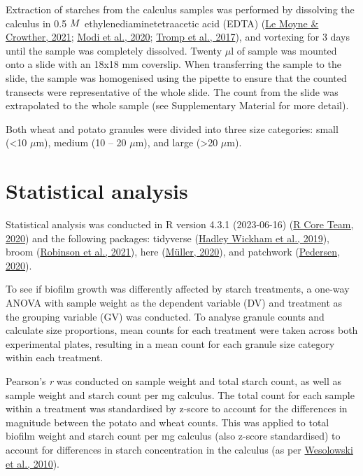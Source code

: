 \documentclass[
  letterpaper,
]{book}
\begin{document}
Extraction of starches from the calculus samples was performed by
dissolving the calculus in 0.5 \(\tiny{M}\) ethylenediaminetetraacetic
acid (EDTA) (\protect\hyperlink{ref-lemoyneCalculusPretreatments2021}{Le
Moyne \& Crowther, 2021};
\protect\hyperlink{ref-modiCalculusMethodologies2020}{Modi et al.,
2020}; \protect\hyperlink{ref-trompEDTACalculus2017}{Tromp et al.,
2017}), and vortexing for 3 days until the sample was completely
dissolved. Twenty \(\mu\)l of sample was mounted onto a slide with an
18x18 mm coverslip. When transferring the sample to the slide, the
sample was homogenised using the pipette to ensure that the counted
transects were representative of the whole slide. The count from the
slide was extrapolated to the whole sample (see Supplementary Material
for more detail).

Both wheat and potato granules were divided into three size categories:
small (\textless10 \(\mu\)m), medium (10 -- 20 \(\mu\)m), and large
(\textgreater20 \(\mu\)m).

\hypertarget{statistical-analysis}{%
\section{Statistical analysis}\label{statistical-analysis}}

Statistical analysis was conducted in R version 4.3.1 (2023-06-16)
(\protect\hyperlink{ref-Rbase}{R Core Team, 2020}) and the following
packages: tidyverse (\protect\hyperlink{ref-tidyverse2019}{Hadley
Wickham et al., 2019}), broom (\protect\hyperlink{ref-Rbroom}{Robinson
et al., 2021}), here (\protect\hyperlink{ref-Rhere}{Müller, 2020}), and
patchwork (\protect\hyperlink{ref-Rpatchwork}{Pedersen, 2020}).

To see if biofilm growth was differently affected by starch treatments,
a one-way ANOVA with sample weight as the dependent variable (DV) and
treatment as the grouping variable (GV) was conducted. To analyse
granule counts and calculate size proportions, mean counts for each
treatment were taken across both experimental plates, resulting in a
mean count for each granule size category within each treatment.

Pearson's \emph{r} was conducted on sample weight and total starch
count, as well as sample weight and starch count per mg calculus. The
total count for each sample within a treatment was standardised by
z-score to account for the differences in magnitude between the potato
and wheat counts. This was applied to total biofilm weight and starch
count per mg calculus (also z-score standardised) to account for
differences in starch concentration in the calculus (as per
\protect\hyperlink{ref-wesolowskiEvaluatingMicrofossil2010}{Wesolowski
et al., 2010}).
\end{document}
